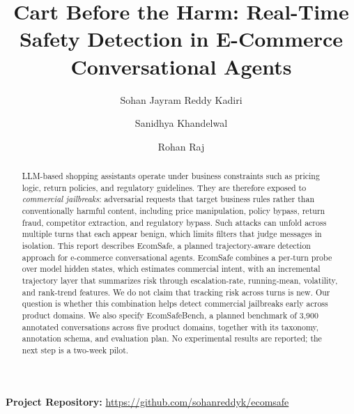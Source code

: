 \documentclass[sigconf]{acmart}
\begin{document}
\title{Cart Before the Harm: Real-Time Safety Detection in E-Commerce Conversational Agents}

\author{Sohan Jayram Reddy Kadiri}

\author{Sanidhya Khandelwal}

\author{Rohan Raj}

\renewcommand{\shortauthors}{Kadiri, Khandelwal, and Raj}

\begin{abstract}
LLM-based shopping assistants operate under business constraints such as pricing logic, return policies, and regulatory guidelines. They are therefore exposed to \emph{commercial jailbreaks}: adversarial requests that target business rules rather than conventionally harmful content, including price manipulation, policy bypass, return fraud, competitor extraction, and regulatory bypass. Such attacks can unfold across multiple turns that each appear benign, which limits filters that judge messages in isolation. This report describes EcomSafe, a planned trajectory-aware detection approach for e-commerce conversational agents. EcomSafe combines a per-turn probe over model hidden states, which estimates commercial intent, with an incremental trajectory layer that summarizes risk through escalation-rate, running-mean, volatility, and rank-trend features. We do not claim that tracking risk across turns is new. Our question is whether this combination helps detect commercial jailbreaks early across product domains. We also specify EcomSafeBench, a planned benchmark of 3,900 annotated conversations across five product domains, together with its taxonomy, annotation schema, and evaluation plan. No experimental results are reported; the next step is a two-week pilot.
\end{abstract}


\maketitle

\noindent\textbf{Project Repository:}
\url{https://github.com/sohanreddyk/ecomsafe}
\end{document}
